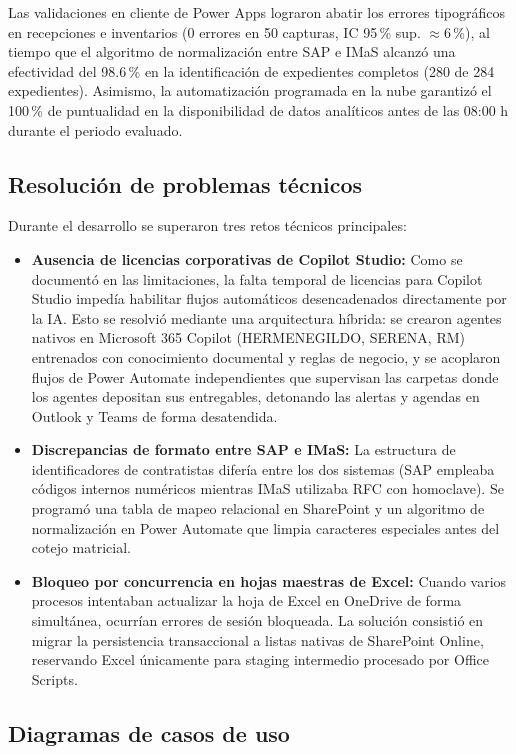 Las validaciones en cliente de Power Apps lograron abatir los errores tipográficos en recepciones e inventarios (0 errores en 50 capturas, IC 95\,\% sup. $\approx 6$\,\%), al tiempo que el algoritmo de normalización entre SAP e IMaS alcanzó una efectividad del 98.6\,\% en la identificación de expedientes completos (280 de 284 expedientes). Asimismo, la automatización programada en la nube garantizó el 100\,\% de puntualidad en la disponibilidad de datos analíticos antes de las 08:00 h durante el periodo evaluado.

\subsection{Resolución de problemas técnicos}

Durante el desarrollo se superaron tres retos técnicos principales:
\begin{itemize}
    \item \textbf{Ausencia de licencias corporativas de Copilot Studio:} Como se documentó en las limitaciones, la falta temporal de licencias para Copilot Studio impedía habilitar flujos automáticos desencadenados directamente por la IA. Esto se resolvió mediante una arquitectura híbrida: se crearon agentes nativos en Microsoft 365 Copilot (HERMENEGILDO, SERENA, RM) entrenados con conocimiento documental y reglas de negocio, y se acoplaron flujos de Power Automate independientes que supervisan las carpetas donde los agentes depositan sus entregables, detonando las alertas y agendas en Outlook y Teams de forma desatendida.
    \item \textbf{Discrepancias de formato entre SAP e IMaS:} La estructura de identificadores de contratistas difería entre los dos sistemas (SAP empleaba códigos internos numéricos mientras IMaS utilizaba RFC con homoclave). Se programó una tabla de mapeo relacional en SharePoint y un algoritmo de normalización en Power Automate que limpia caracteres especiales antes del cotejo matricial.
    \item \textbf{Bloqueo por concurrencia en hojas maestras de Excel:} Cuando varios procesos intentaban actualizar la hoja de Excel en OneDrive de forma simultánea, ocurrían errores de sesión bloqueada. La solución consistió en migrar la persistencia transaccional a listas nativas de SharePoint Online, reservando Excel únicamente para staging intermedio procesado por Office Scripts.
\end{itemize}

\subsection{Diagramas de casos de uso} \label{sec:casos_uso} %

